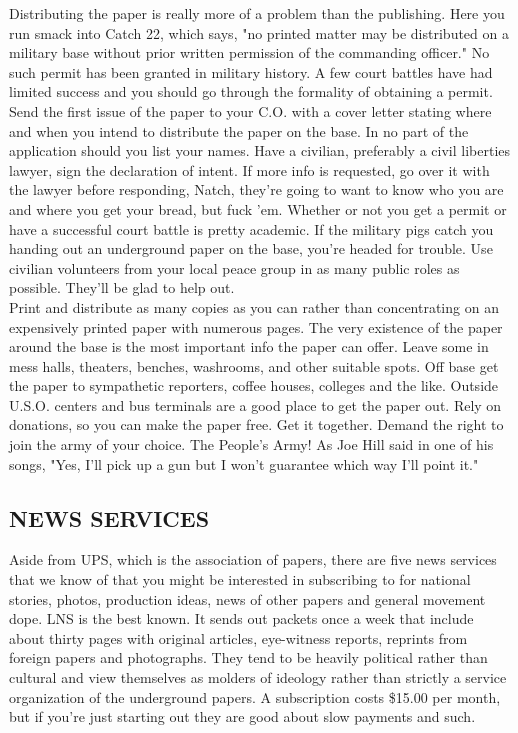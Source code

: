 \documentclass[11pt,twoside,a4paper]{book}
\begin{document}
Distributing the paper is really more of a problem than the publishing. Here you run smack into Catch 22, which says, "no printed matter may be distributed on a military base without prior written permission of the commanding officer." No such permit has been granted in military history. A few court battles have had limited success and you should go through the formality of obtaining a permit. Send the first issue of the paper to your C.O. with a cover letter stating where and when you intend to distribute the paper on the base. In no part of the application should you list your names. Have a civilian, preferably a civil liberties lawyer, sign the declaration of intent. If more info is requested, go over it with the lawyer before responding, Natch, they're going to want to know who you are and where you get your bread, but fuck 'em. Whether or not you get a permit or have a successful court battle is pretty academic. If the military pigs catch you handing out an underground paper on the base, you're headed for trouble. Use civilian volunteers from your local peace group in as many public roles as possible. They'll be glad to help out.~\\

Print and distribute as many copies as you can rather than concentrating on an expensively printed paper with numerous pages. The very existence of the paper around the base is the most important info the paper can offer. Leave some in mess halls, theaters, benches, washrooms, and other suitable spots. Off base get the paper to sympathetic reporters, coffee houses, colleges and the like. Outside U.S.O. centers and bus terminals are a good place to get the paper out. Rely on donations, so you can make the paper free. Get it together. Demand the right to join the army of your choice. The People's Army! As Joe Hill said in one of his songs, "Yes, I'll pick up a gun but I won't guarantee which way I'll point it."

\subsection{NEWS SERVICES}

Aside from UPS, which is the association of papers, there are five news services that we know of that you might be interested in subscribing to for national stories, photos, production ideas, news of other papers and general movement dope. LNS is the best known. It sends out packets once a week that include about thirty pages with original articles, eye-witness reports, reprints from foreign papers and photographs. They tend to be heavily political rather than cultural and view themselves as molders of ideology rather than strictly a service organization of the underground papers. A subscription costs \$15.00 per month, but if you're just starting out they are good about slow payments and such.~\\
\end{document}
